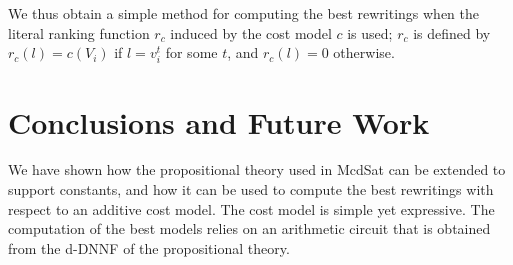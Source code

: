 \documentclass{llncs}
\begin{document}
We thus obtain a simple method for computing the best
rewritings when the literal ranking function $r_c$ induced
by the cost model $c$ is used; $r_c$ is defined by
$r_c(l)=c(V_i)$ if $l=v^t_i$ for some $t$, and $r_c(l)=0$
otherwise.


\section{Conclusions and Future Work}

We have shown how the propositional theory used in McdSat can
be extended to support constants, and how it can be used to 
compute the best rewritings with respect to an additive
cost model. The cost model is simple yet expressive.
The computation of the best models relies on an arithmetic
circuit that is obtained from the d-DNNF of the propositional
theory.



\end{document}
